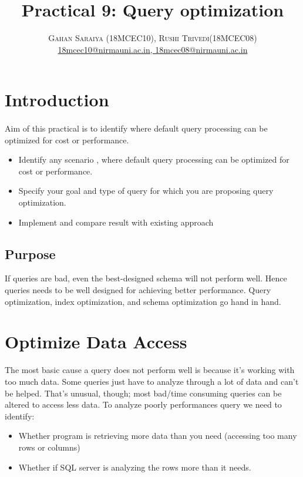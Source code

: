 \documentclass[paper=letter, fontsize=12pt]{article}
\title{\vspace{-15mm}\fontsize{24pt}{10pt}\selectfont\textbf{Practical 9: Query optimization}} %
\author{
\large
{\textsc{Gahan Saraiya (18MCEC10), Rushi Trivedi(18MCEC08) }}\\[2mm]
\normalsize \href{mailto:18mcec10@nirmauni.ac.in}{18mcec10@nirmauni.ac.in, 18mcec08@nirmauni.ac.in}\\[2mm] %
}
\date{}
\begin{document}
\maketitle %
\thispagestyle{fancy} %


\section{Introduction}
\paragraph{} Aim of this practical is to identify where default query processing can be optimized for cost or performance.

\begin{itemize}
	\item Identify  any scenario , where default query processing can be optimized for cost or performance.
	\item Specify your goal and type of query for which you are proposing query optimization.
	\item Implement and compare result with existing approach
\end{itemize}

\subsection{Purpose}
If queries are bad, even the best-designed schema will not perform well. Hence queries needs to be well designed for achieving better performance. Query optimization, index optimization, and schema optimization go hand in hand.

\section{Optimize Data Access}
The most basic cause a query does not perform well is because it’s working with too much data. Some queries just have to analyze through a lot of data and can’t be helped. That’s unusual, though; most bad/time consuming queries can be altered to access less data. To analyze poorly performances query we need to identify:
\begin{itemize}
	\item Whether program is retrieving more data than you need (accessing too many rows or columns)
	\item Whether if SQL server is analyzing the rows more than it needs.
\end{itemize}
\end{document}
